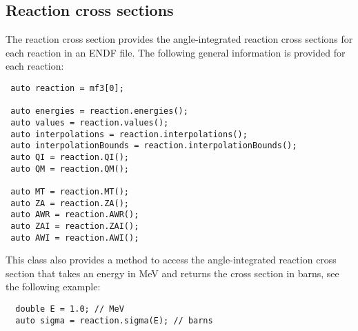 \documentclass[../main.tex]{subfiles}
\begin{document}
\subsection{Reaction cross sections}
The reaction cross section provides the angle-integrated reaction cross sections for each reaction in an ENDF file. The following general information is provided for each reaction:
\begin{verbatim}
 auto reaction = mf3[0];

 auto energies = reaction.energies();
 auto values = reaction.values();
 auto interpolations = reaction.interpolations();
 auto interpolationBounds = reaction.interpolationBounds();
 auto QI = reaction.QI();
 auto QM = reaction.QM();

 auto MT = reaction.MT();
 auto ZA = reaction.ZA();
 auto AWR = reaction.AWR();
 auto ZAI = reaction.ZAI();
 auto AWI = reaction.AWI();
\end{verbatim}

This class also provides a method to access the angle-integrated reaction cross section that takes an energy in MeV and returns the cross section in barns, see the following example:
\begin{verbatim}
  double E = 1.0; // MeV
  auto sigma = reaction.sigma(E); // barns
\end{verbatim}
\end{document}
